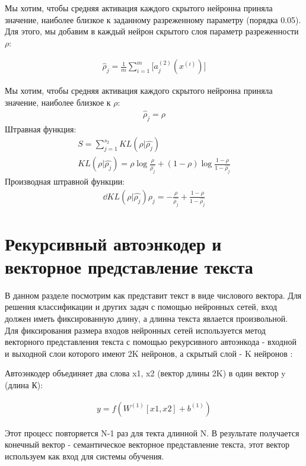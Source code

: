 \documentclass[12pt]{article}
\begin{document}
Мы хотим, чтобы средняя активация каждого скрытого нейронна приняла значение, наиболее близкое к заданному разреженному параметру (порядка 0.05). Для этого, мы добавим в каждый нейрон скрытого слоя параметр разреженности $\rho$:

  \begin{align}
	\hat \rho_j=\frac{1}{m}\sum_{i=1}^m\biggl[a^{(2)}_j(x^{(i)})\biggl]
  \end{align}

  Мы хотим, чтобы средняя активация каждого скрытого нейронна приняла значение, наиболее близкое к $\rho$:
  \begin{align}
	\hat \rho_j=\rho
  \end{align}
  Штравная функция:
  \begin{align}
	S=\sum_{j=1}^{s_2}{KL({\rho}|{\hat{\rho_j}})}\\
	KL({\rho}|{\hat{\rho_j}})=\rho\log{\frac{\rho}{\hat{\rho_j}}}+(1-\rho)\log{\frac{1-\rho}{1-\hat{\rho_j}}}
  \end{align}
  Производная штравной функции:
  \begin{align}
	\dd{KL({\rho}|{\hat{\rho_j}})}{\rho_j}=-\frac{\rho}{\hat{\rho_j}} + \frac{1-\rho}{1-\hat{\rho_j}}
  \end{align}

\section{Рекурсивный автоэнкодер и векторное представление текста}

В данном разделе посмотрим как представит текст в виде числового вектора. Для решения классификации и других задач с помощью нейронных сетей, вход должен иметь фиксированную длину, а длинна текста явлается произвольной. Для фиксирования размера входов нейронных сетей используется метод векторного представления текста с помощью рекурсивного автоэнкода - входной и выходной слои которого имеют 2K нейронов, а скрытый слой - K нейронов \cite{Socher2}: 

Автоэнкодер объединяет два слова x1, x2 (вектор длины 2K) в один вектор y (длина К):

  \begin{align}
	y=f{(W^{(1)}[x1, x2] + b^{(1)})}
  \end{align}

Этот процесс повторяется N-1 раз для текта длинной N. В результате получается конечный вектор - семантическое векторное представление текста, этот вектор используем как вход для системы обучения.
\end{document}
